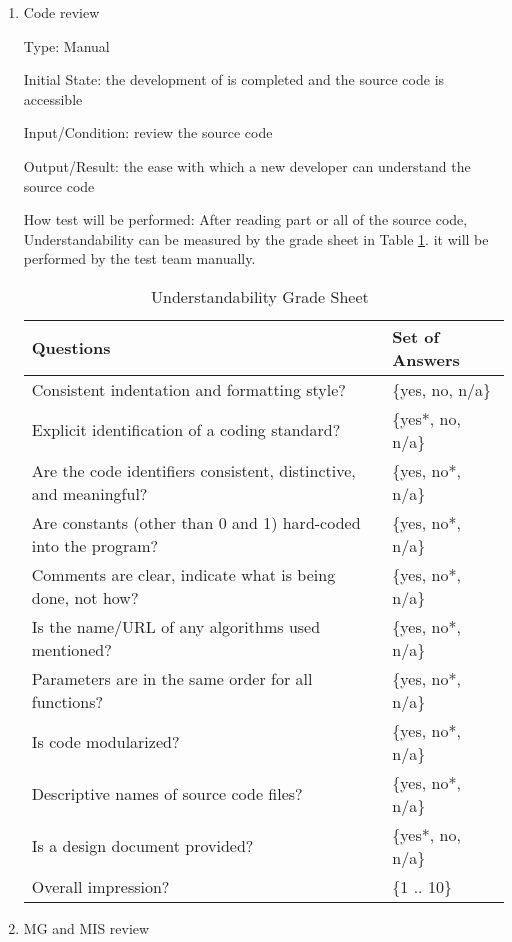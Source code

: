 \documentclass[12pt, titlepage]{article}
\begin{document}
\begin{enumerate}

\item{Code review}

Type: Manual
					
Initial State: the development of \progname{} is completed and the source code
is accessible
					
Input/Condition: review the source code
					
Output/Result: the ease with which a new developer can understand the source
code
					
How test will be performed: After reading part or all of the source code,
Understandability can be measured by the grade sheet in Table
\ref{Tb_understandable}. it will be performed by the test team manually.

\begin{table}[h]
\begin{tabular}{@{}ll@{}}
\toprule
Questions & Set of Answers \\ \midrule
Consistent indentation and formatting style? & \{yes, no, n/a\} \\
Explicit identification of a coding standard? & \{yes*, no, n/a\} \\
Are the code identifiers consistent, distinctive, and meaningful? & \{yes, no*, n/a\} \\
Are constants (other than 0 and 1) hard-coded into the program? & \{yes, no*, n/a\} \\
Comments are clear, indicate what is being done, not how? & \{yes, no*, n/a\} \\
Is the name/URL of any algorithms used mentioned? & \{yes, no*, n/a\} \\
Parameters are in the same order for all functions? & \{yes, no*, n/a\} \\
Is code modularized? & \{yes, no*, n/a\} \\
Descriptive names of source code files? & \{yes, no*, n/a\} \\
Is a design document provided? & \{yes*, no, n/a\} \\
Overall impression? & \{1 .. 10\} \\ \bottomrule
\end{tabular}
\caption{Understandability Grade Sheet~\cite{SmithEtAl2018}}
\label{Tb_understandable}
\end{table}

\item{MG and MIS review}


\end{enumerate}
\end{document}

